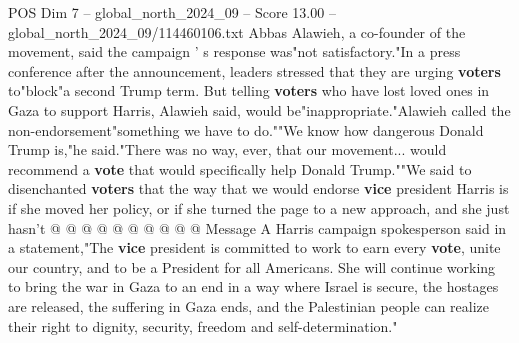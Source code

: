 \begin{textsample}{POS Dim 7 – global\_north\_2024\_09 – Score 13.00 – global\_north\_2024\_09/114460106.txt}
Abbas Alawieh, a co-founder of the movement, said the campaign ' s response was"not satisfactory."In a press conference after the announcement, leaders stressed that they are urging \textbf{voters} to"block"a second Trump term.
But telling \textbf{voters} who have lost loved ones in Gaza to support Harris, Alawieh said, would be"inappropriate."Alawieh called the non-endorsement"something we have to do.""We know how dangerous Donald Trump is,"he said."There was no way, ever, that our movement... would recommend a \textbf{vote} that would specifically help Donald Trump.""We said to disenchanted \textbf{voters} that the way that we would endorse \textbf{vice} president Harris is if she moved her policy, or if she turned the page to a new approach, and she just hasn't @ @ @ @ @ @ @ @ @ @ Message A Harris campaign spokesperson said in a statement,"The \textbf{vice} president is committed to work to earn every \textbf{vote}, unite our country, and to be a President for all Americans.
She will continue working to bring the war in Gaza to an end in a way where Israel is secure, the hostages are released, the suffering in Gaza ends, and the Palestinian people can realize their right to dignity, security, freedom and self-determination."

\end{textsample}
